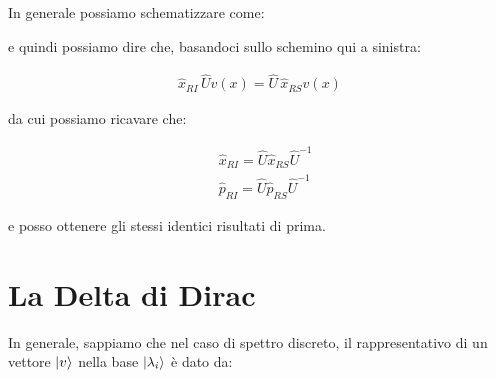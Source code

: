 	In generale possiamo schematizzare come:
	
\vspace{1em}

\begin{minipage}{0.52\textwidth}


\end{minipage}
\hfill
\begin{minipage}{0.46\textwidth}
	e quindi possiamo dire che, basandoci sullo schemino qui a sinistra:
	
\begin{align*}
	\hat{x}_{RI} \, \hat{U} v(x) = \hat{U} \, \hat{x}_{RS} v(x)
\end{align*}

	da cui possiamo ricavare che:
	
\begin{align*}
	& \hat{x}_{RI} = \hat{U} \hat{x}_{RS} \hat{U}^{-1}\\
	& \hat{p}_{RI} = \hat{U} \hat{p}_{RS} \hat{U}^{-1}
\end{align*}

\end{minipage}
\vspace{1em}
	
	e posso ottenere gli stessi identici risultati di prima.
	
\section{La Delta di Dirac}

	In generale, sappiamo che nel caso di spettro discreto, il rappresentativo di un vettore $\ket{v}$ nella base $\ket{\lambda_i}$ è dato da:

